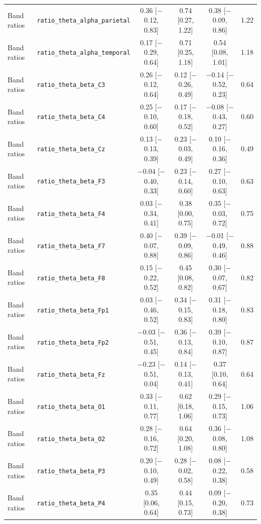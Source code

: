 {\begin{longtable}{llcccc}
Band ratios & \texttt{ratio\_theta\_alpha\_parietal} & 0.36 [$-$0.12, 0.83] & 0.74 [0.27, 1.22] & 0.38 [$-$0.09, 0.86] & 1.22 \\
Band ratios & \texttt{ratio\_theta\_alpha\_temporal} & 0.17 [$-$0.29, 0.64] & 0.71 [0.25, 1.18] & 0.54 [0.08, 1.01] & 1.18 \\
Band ratios & \texttt{ratio\_theta\_beta\_C3} & 0.26 [$-$0.12, 0.64] & 0.12 [$-$0.26, 0.49] & $-$0.14 [$-$0.52, 0.23] & 0.64 \\
Band ratios & \texttt{ratio\_theta\_beta\_C4} & 0.25 [$-$0.10, 0.60] & 0.17 [$-$0.18, 0.52] & $-$0.08 [$-$0.43, 0.27] & 0.60 \\
Band ratios & \texttt{ratio\_theta\_beta\_Cz} & 0.13 [$-$0.13, 0.39] & 0.23 [$-$0.03, 0.49] & 0.10 [$-$0.16, 0.36] & 0.49 \\
Band ratios & \texttt{ratio\_theta\_beta\_F3} & $-$0.04 [$-$0.40, 0.33] & 0.23 [$-$0.14, 0.60] & 0.27 [$-$0.10, 0.63] & 0.63 \\
Band ratios & \texttt{ratio\_theta\_beta\_F4} & 0.03 [$-$0.34, 0.41] & 0.38 [0.00, 0.75] & 0.35 [$-$0.03, 0.72] & 0.75 \\
Band ratios & \texttt{ratio\_theta\_beta\_F7} & 0.40 [$-$0.07, 0.88] & 0.39 [$-$0.09, 0.86] & $-$0.01 [$-$0.49, 0.46] & 0.88 \\
Band ratios & \texttt{ratio\_theta\_beta\_F8} & 0.15 [$-$0.22, 0.52] & 0.45 [0.08, 0.82] & 0.30 [$-$0.07, 0.67] & 0.82 \\
Band ratios & \texttt{ratio\_theta\_beta\_Fp1} & 0.03 [$-$0.46, 0.52] & 0.34 [$-$0.15, 0.83] & 0.31 [$-$0.18, 0.80] & 0.83 \\
Band ratios & \texttt{ratio\_theta\_beta\_Fp2} & $-$0.03 [$-$0.51, 0.45] & 0.36 [$-$0.13, 0.84] & 0.39 [$-$0.10, 0.87] & 0.87 \\
Band ratios & \texttt{ratio\_theta\_beta\_Fz} & $-$0.23 [$-$0.51, 0.04] & 0.14 [$-$0.13, 0.41] & 0.37 [0.10, 0.64] & 0.64 \\
Band ratios & \texttt{ratio\_theta\_beta\_O1} & 0.33 [$-$0.11, 0.77] & 0.62 [0.18, 1.06] & 0.29 [$-$0.15, 0.73] & 1.06 \\
Band ratios & \texttt{ratio\_theta\_beta\_O2} & 0.28 [$-$0.16, 0.72] & 0.64 [0.20, 1.08] & 0.36 [$-$0.08, 0.80] & 1.08 \\
Band ratios & \texttt{ratio\_theta\_beta\_P3} & 0.20 [$-$0.10, 0.49] & 0.28 [$-$0.02, 0.58] & 0.08 [$-$0.22, 0.38] & 0.58 \\
Band ratios & \texttt{ratio\_theta\_beta\_P4} & 0.35 [0.06, 0.64] & 0.44 [0.15, 0.73] & 0.09 [$-$0.20, 0.38] & 0.73 \\

\end{longtable}}
